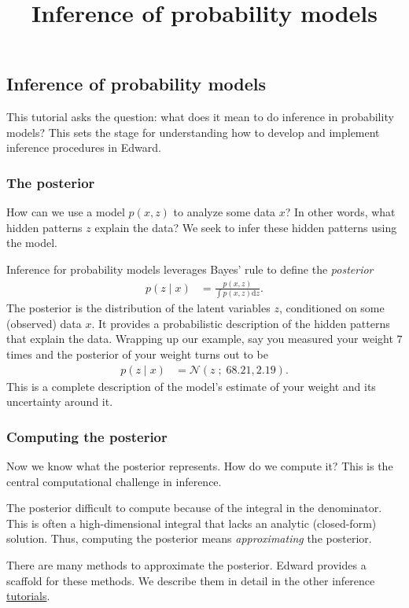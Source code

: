 \title{Inference of probability models}

\subsection{Inference of probability models}

This tutorial asks the question: what does it mean to do inference in
probability models? This sets the stage for understanding how to
develop and implement inference procedures in Edward.

\subsubsection{The posterior}

How can we use a model $p(x,z)$ to analyze some data $x$? In other words,
what hidden patterns $z$ explain the data? We seek to infer these
hidden patterns using the model.

Inference for probability models leverages Bayes' rule to define the
\emph{posterior}
\begin{align*}
  p(z \mid x)
  &=
  \frac{p(x,z)}{\int p(x,z) \text{d}z}.
\end{align*}
The posterior is the distribution of the latent variables $z$, conditioned on
some (observed) data $x$. It provides a probabilistic description of the hidden
patterns that explain the data. Wrapping up our example, say you measured your
weight $7$ times and the posterior of your weight turns out to be
\begin{align*}
  p(z \mid x) &= \mathcal{N}(z\;;\; 68.21, 2.19).
\end{align*}
This is a complete description of the model's estimate of your weight and its
uncertainty around it.


\subsubsection{Computing the posterior}

Now we know what the posterior represents. How do we compute it? This is the
central computational challenge in inference.

The posterior difficult to compute because of the integral in the denominator.
This is often a high-dimensional integral that lacks an analytic (closed-form)
solution. Thus, computing the posterior means \emph{approximating} the
posterior.

There are many methods to approximate the posterior. Edward provides a scaffold
for these methods. We describe them in detail in the other inference
\href{tutorials.html}{tutorials}.
